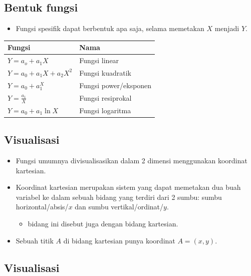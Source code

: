 \documentclass[
  letterpaper,
  DIV=11,
  numbers=noendperiod]{scrartcl}
\providecommand{\tightlist}{%
  \setlength{\itemsep}{0pt}\setlength{\parskip}{0pt}}\usepackage{longtable,booktabs,array}
\begin{document}
\subsection{Bentuk fungsi}\label{bentuk-fungsi}

\begin{itemize}
\tightlist
\item
  Fungsi spesifik dapat berbentuk apa saja, selama memetakan \(X\)
  menjadi \(Y\).
\end{itemize}

\begin{longtable}[]{@{}ll@{}}
\toprule\noalign{}
Fungsi & Nama \\
\midrule\noalign{}
\endhead
\bottomrule\noalign{}
\endlastfoot
\(Y=a_o+a_1X\) & Fungsi linear \\
\(Y=a_0+a_1X+a_2X^2\) & Fungsi kuadratik \\
\(Y=a_0+a_1^X\) & Fungsi power/eksponen \\
\(Y=\frac{a_1}{X}\) & Fungsi resiprokal \\
\(Y=a_0+a_1 \ln X\) & Fungsi logaritma \\
\end{longtable}

\subsection{Visualisasi}\label{visualisasi}

\begin{itemize}
\item
  Fungsi umumnya divisualisasikan dalam 2 dimensi menggunakan koordinat
  kartesian.
\item
  Koordinat kartesian merupakan sistem yang dapat memetakan dua buah
  variabel ke dalam sebuah bidang yang terdiri dari 2 sumbu: sumbu
  horizontal/absis/\(x\) dan sumbu vertikal/ordinat/\(y\).

  \begin{itemize}
  \tightlist
  \item
    bidang ini disebut juga dengan bidang kartesian.
  \end{itemize}
\item
  Sebuah titik \(A\) di bidang kartesian punya koordinat \(A=(x,y)\).
\end{itemize}

\subsection{Visualisasi}\label{visualisasi-1}
\end{document}
